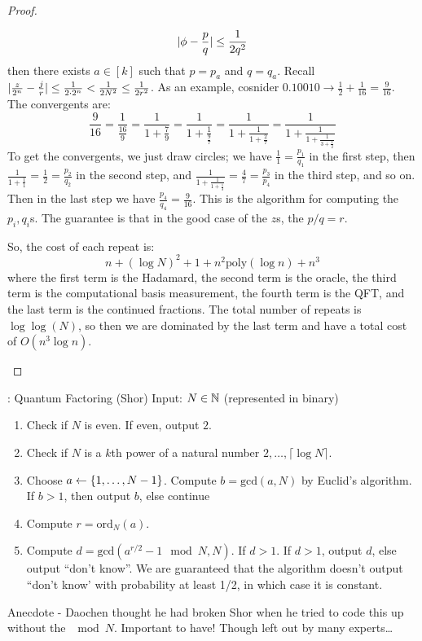 \begin{proof}
\begin{enumerate}
\begin{enumerate}
            \begin{equation}
                \lvert \phi - \frac{p}{q} \rvert \leq \frac{1}{2q^2}
            \end{equation}
            then there exists $a \in [k]$ such that $p = p_a$ and $q = q_a$. Recall $\lvert \frac{z}{2^n} - \frac{j}{r} \rvert \leq \frac{1}{2\cdot 2^n} < \frac{1}{2N^2} \leq \frac{1}{2r^2}$. As an example, cosnider $0.10010 \to \frac{1}{2} + \frac{1}{16} = \frac{9}{16}$. The convergents are:
            \begin{equation}
                \frac{9}{16} = \frac{1}{\frac{16}{9}} = \frac{1}{1 + \frac{7}{9}} = \frac{1}{1 + \frac{1}{\frac{9}{7}}} = \frac{1}{1 + \frac{1}{1 + \frac{2}{7}}} = \frac{1}{1 + \frac{1}{1 + \frac{1}{3 + \frac{1}{2}}}}
            \end{equation}
            To get the convergents, we just draw circles; we have $\frac{1}{1} = \frac{p_1}{q_1}$ in the first step, then $\frac{1}{1 + \frac{1}{1}} = \frac{1}{2} = \frac{p_2}{q_2}$ in the second step, and $\frac{1}{1 + \frac{1}{1 + \frac{1}{3}}} = \frac{4}{7} = \frac{p_3}{p_4}$ in the third step, and so on. Then in the last step we have $\frac{p_4}{q_4} = \frac{9}{16}$. This is the algorithm for computing the $p_i, q_i$s. The guarantee is that in the good case of the $z$s, the $p/q = r$. 

            So, the cost of each repeat is:
            \begin{equation}
                n + (\log N)^2 + 1 + n^2\text{poly}(\log n) + n^3
            \end{equation}
            where the first term is the Hadamard, the second term is the oracle, the third term is the computational basis measurement, the fourth term is the QFT, and the last term is the continued fractions. The total number of repeats is $\log\log(N)$, so then we are dominated by the last term and have a total cost of $O(n^3\log n)$. 
        \end{enumerate} 
    \end{enumerate}
\end{proof}

\begin{algobox}{: Quantum Factoring (Shor)}
    Input: $N \in \mathbb{N}$ (represented in binary)
    \begin{enumerate}
        \item Check if $N$ is even. If even, output $2$.
        \item Check if $N$ is a $k$th power of a natural number $2, \ldots, \lceil \log N \rceil$.
        \item Choose $a \leftarrow \set{1, \ldots, N-1}$. Compute $b = \text{gcd}(a, N)$ by Euclid's algorithm. If $b > 1$, then output $b$, else continue
        \item Compute $r = \text{ord}_N(a)$. 
        \item Compute $d = \text{gcd}(a^{r/2} - 1 \mod N, N)$. If $d > 1$. If $d > 1$, output $d$, else output ``don't know''. We are guaranteed that the algorithm doesn't output ``don't know' with probability at least 1/2, in which case it is constant.
    \end{enumerate}
\end{algobox}

Anecdote - Daochen thought he had broken Shor when he tried to code this up without the $\mod N$. Important to have! Though left out by many experts\ldots